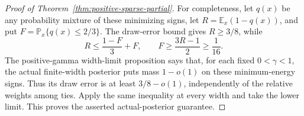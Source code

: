 \begin{proof}[Proof of Theorem~\ref{thm:positive-sparse-partial}]
For completeness, let $q(x)$ be any probability mixture of these
minimizing signs, let $R=\mathbb E_x(1-q(x))$, and put
$F=\mathbb P_x\{q(x)\le2/3\}$.
The draw-error bound gives $R\ge3/8$, while
\[
 R\le\frac{1-F}{3}+F,
 \qquad F\ge\frac{3R-1}{2}\ge\frac1{16}.
\]
The positive-gamma width-limit proposition says that, for each fixed
$0<\gamma<1$, the actual finite-width posterior puts mass $1-o(1)$
on these minimum-energy signs. Thus its draw error is at least
$3/8-o(1)$, independently of the relative weights among ties.
Apply the same inequality at every width and take the lower limit.
This proves the asserted actual-posterior guarantee.
\end{proof}
